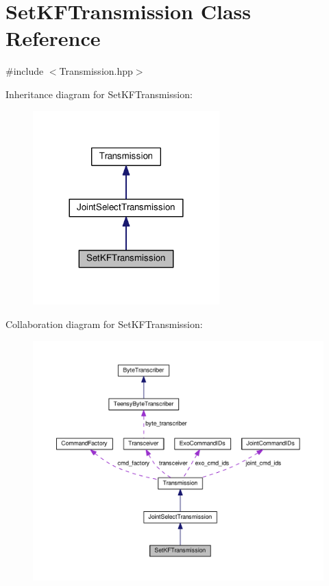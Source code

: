 \hypertarget{classSetKFTransmission}{}\section{Set\+K\+F\+Transmission Class Reference}
\label{classSetKFTransmission}


{\ttfamily \#include $<$Transmission.\+hpp$>$}



Inheritance diagram for Set\+K\+F\+Transmission\+:\nopagebreak
\begin{figure}[H]
\begin{center}
\leavevmode
\includegraphics[width=204pt]{classSetKFTransmission__inherit__graph}
\end{center}
\end{figure}


Collaboration diagram for Set\+K\+F\+Transmission\+:
\nopagebreak
\begin{figure}[H]
\begin{center}
\leavevmode
\includegraphics[width=350pt]{classSetKFTransmission__coll__graph}
\end{center}
\end{figure}
